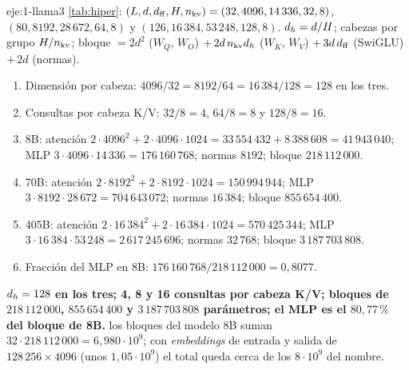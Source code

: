 \begin{solucion}{eje:1-llama3}
\datos \cref{tab:hiper}: $(L,d,d_{\mathrm{ff}},H,n_{\mathrm{kv}})=(32,4096,14\,336,32,8)$, $(80,8192,28\,672,64,8)$ y $(126,16\,384,53\,248,128,8)$.
\planteamiento $d_{h}=d/H$; cabezas por grupo $H/n_{\mathrm{kv}}$; bloque $=2d^{2}$ ($W_Q$, $W_O$) $+\,2d\,n_{\mathrm{kv}}d_{h}$ ($W_K$, $W_V$) $+\,3d\,d_{\mathrm{ff}}$ (SwiGLU) $+\,2d$ (normas).
\pasos
\begin{enumerate}[label=\arabic*.]
  \item Dimensión por cabeza: $4096/32=8192/64=16\,384/128=128$ en los tres.
  \item Consultas por cabeza K/V: $32/8=4$, $64/8=8$ y $128/8=16$.
  \item 8B: atención $2\cdot 4096^{2}+2\cdot 4096\cdot 1024=33\,554\,432+8\,388\,608=41\,943\,040$; MLP $3\cdot 4096\cdot 14\,336=176\,160\,768$; normas $8192$; bloque $218\,112\,000$.
  \item 70B: atención $2\cdot 8192^{2}+2\cdot 8192\cdot 1024=150\,994\,944$; MLP $3\cdot 8192\cdot 28\,672=704\,643\,072$; normas $16\,384$; bloque $855\,654\,400$.
  \item 405B: atención $2\cdot 16\,384^{2}+2\cdot 16\,384\cdot 1024=570\,425\,344$; MLP $3\cdot 16\,384\cdot 53\,248=2\,617\,245\,696$; normas $32\,768$; bloque $3\,187\,703\,808$.
  \item Fracción del MLP en 8B: $176\,160\,768/218\,112\,000=0{,}8077$.
\end{enumerate}
\resultado \textbf{$d_{h}=128$ en los tres; 4, 8 y 16 consultas por cabeza K/V; bloques de $218\,112\,000$, $855\,654\,400$ y $3\,187\,703\,808$ parámetros; el MLP es el $80{,}77\,\%$ del bloque de 8B.}
\comprobacion los bloques del modelo 8B suman $32\cdot 218\,112\,000=6{,}980\cdot 10^{9}$; con \emph{embeddings} de entrada y salida de $128\,256\times 4096$ (unos $1{,}05\cdot 10^{9}$) el total queda cerca de los $8\cdot 10^{9}$ del nombre.
\end{solucion}


